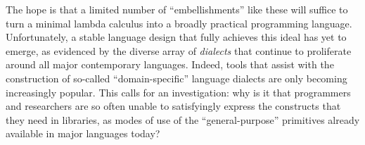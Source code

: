 The hope is that a limited number of ``embellishments'' like these will suffice to turn a minimal lambda calculus into a broadly practical programming language. %
Unfortunately, a stable language design that fully achieves this ideal has yet to emerge, as evidenced by the diverse array of \emph{dialects} that continue to proliferate around all major contemporary languages. %
Indeed, tools that assist with the construction of so-called  ``domain-specific'' language dialects are only becoming increasingly popular. 
{This calls for an investigation}: why is it that programmers and researchers are so often unable to satisfyingly express the constructs that they need in libraries, as modes of use of the ``general-purpose'' primitives already available in major languages today?


